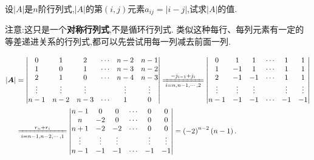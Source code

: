 \documentclass[../../main.tex]{subfiles}%
\begin{document}
\begin{example}
设\(\vert A\vert\)是\(n\)阶行列式,\(\vert A\vert\)的第\((i,j)\)元素\(a_{ij}=\vert i - j\vert\),试求\(\vert A\vert\)的值.
\end{example}
\begin{note}
注意:这只是一个\textbf{对称行列式},不是循环行列式.
类似这种每行、每列元素有一定的等差递进关系的行列式,都可以先尝试用每一列减去前面一列.
\end{note}
\begin{solution}
\begin{align*}
\left| \boldsymbol{A} \right|&=\left| \begin{matrix}
0&		1&		2&		\cdots&		n-2&		n-1\\
1&		0&		1&		\cdots&		n-3&		n-2\\
2&		1&		0&		\cdots&		n-4&		n-3\\
\vdots&		\vdots&		\vdots&		&		\vdots&		\vdots\\
n-1&		n-2&		n-3&		\cdots&		1&		0\\
\end{matrix} \right|\xlongequal[i=n,n-1,\cdots ,2]{-j_{i-1}+j_i}\left| \begin{matrix}
0&		1&		1&		\cdots&		1&		1\\
1&		-1&		1&		\cdots&		1&		1\\
2&		-1&		-1&		\cdots&		1&		1\\
\vdots&		\vdots&		\vdots&		&		\vdots&		\vdots\\
n-1&		-1&		-1&		\cdots&		-1&		-1\\
\end{matrix} \right|
\\
&\xlongequal[i=n-1,n-2,\cdots ,1]{r_n+r_i}\left| \begin{matrix}
n-1&		0&		0&		\cdots&		0&		0\\
n&		-2&		0&		\cdots&		0&		0\\
n+1&		-2&		-2&		\cdots&		0&		0\\
\vdots&		\vdots&		\vdots&		&		\vdots&		\vdots\\
n-1&		-1&		-1&		\cdots&		-1&		-1\\
\end{matrix} \right|=\left( -2 \right) ^{n-2}\left( n-1 \right) .
\end{align*}

\end{solution}
\end{document}
